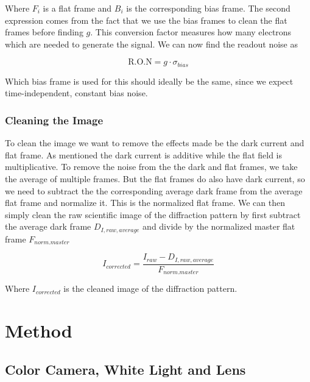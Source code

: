 \documentclass{emulateapj}
\begin{document}
Where $F_i$ is a flat frame and $B_i$ is the corresponding bias frame. The second expression comes from the fact that we use the bias frames to clean the flat frames before finding $g$. This conversion factor measures how many electrons which are needed to generate the signal. We can now find the readout noise as

\begin{equation}
\text{R.O.N} = g\cdot\sigma_{bias}
\end{equation}

Which bias frame is used for this should ideally be the same, since we expect time-independent, constant bias noise.

\subsubsection{Cleaning the Image}
\label{sec:cleaning}
To clean the image we want to remove the effects made be the dark current and flat frame. As mentioned the dark current is additive while the flat field is multiplicative. To remove the noise from the the dark and flat frames, we take the average of multiple frames. But the flat frames do also have dark current, so we need to subtract the the corresponding average dark frame from the average flat frame and normalize it. This is the normalized flat frame. We can then simply clean the raw scientific image of the diffraction pattern by first subtract the average dark frame $D_{I,raw,average}$ and divide by the normalized master flat frame $F_{norm. master}$

\begin{equation}
I_{corrected} = \frac{I_{raw} - D_{I,raw,average}}{F_{norm. master}}
\label{eq:ICorr}
\end{equation}

Where $I_{corrected}$ is the cleaned image of the diffraction pattern.
\section{Method}
\label{sec:method}

\subsection{Color Camera, White Light and Lens}
\end{document}
